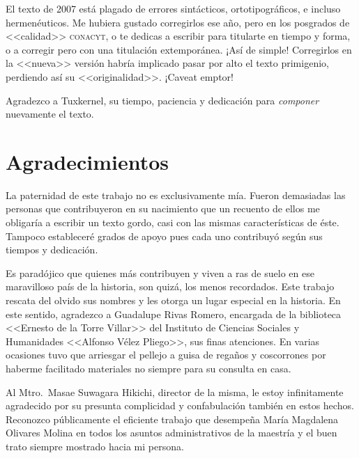 \documentclass[14pt,twoside,final]{extbook} %
\begin{document}
El texto de 2007 está plagado de errores sintácticos, ortotipográficos, e incluso hermenéuticos. Me hubiera gustado corregirlos ese año, pero en los posgrados de <<calidad>> \textsc{conacyt}, o te dedicas a escribir para titularte en tiempo y forma, o a corregir pero con una titulación extemporánea. ¡Así de simple! Corregirlos en la <<nueva>> versión habría implicado pasar por alto el texto primigenio, perdiendo así su <<originalidad>>. ¡Caveat emptor!

Agradezco a Tuxkernel, su tiempo, paciencia y dedicación para \emph{componer} nuevamente el texto.
\chapter*{Agradecimientos}\label{ch:agradecimientos}
\thispagestyle{empty}
\pagestyle{fancy}
\fancyhf{} %
\fancyhead[LE,RO]{\thepage}
\renewcommand{\headrulewidth}{0pt}
\setcounter{page}{7}
La paternidad de este trabajo no es exclusivamente mía. Fueron demasiadas las personas que contribuyeron en su nacimiento que un recuento de ellos me obligaría a escribir un texto gordo, casi con las mismas características de éste. Tampoco estableceré grados de apoyo pues cada uno contribuyó según sus tiempos y dedicación.

Es paradójico que quienes más contribuyen y viven a ras de suelo en ese maravilloso país de la historia, son quizá, los menos recordados. Este trabajo rescata del olvido sus nombres y les otorga un lugar especial en la historia. En este sentido, agradezco a Guadalupe Rivas Romero, encargada de la biblioteca <<Ernesto de la Torre Villar>> del Instituto de Ciencias Sociales y Humanidades <<Alfonso Vélez Pliego>>, sus finas atenciones. En varias ocasiones tuvo que arriesgar el pellejo a guisa de regaños y coscorrones por haberme facilitado materiales no siempre para su consulta en casa.

Al Mtro.~Masae Suwagara Hikichi, director de la misma, le estoy infinitamente agradecido por su presunta complicidad y confabulación también en estos hechos. Reconozco públicamente el eficiente trabajo que desempeña María Magdalena Olivares Molina en todos los asuntos administrativos de la maestría y el buen trato siempre mostrado hacia mi persona.
\end{document}
